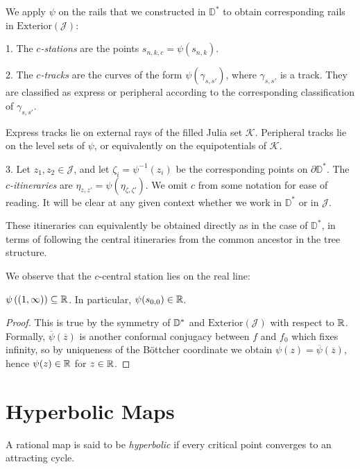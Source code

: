 We apply $\psi$ on the rails that we constructed in $\mathbb D^*$ to obtain corresponding rails in $\mathrm{Exterior}(\mathcal{J})$:
\begin{definition}

1. The 	\emph{$c$-stations} are the points  $s_{n,k,c}=\psi(s_{n,k})$.

2. The \emph{$c$-tracks} are the curves of the form $\psi \left(\gamma_{s,s'}\right)$, where $\gamma_{s,s'}$ is a track. They are classified as express or peripheral according to the corresponding classification of $\gamma_{s,s'}$. 

Express tracks lie on external rays of the filled Julia set $\mathcal K$.
Peripheral tracks lie on the level sets of $\psi$, or equivalently on the equipotentials of $\mathcal K$.

3. Let $z_1,z_2\in \mathcal J$, and let $\zeta_i=\psi^{-1}(z_i)$ be the corresponding points on $\partial \mathbb D^*$. 
The \emph{$c$-itineraries} are $\eta_{z,z'}=\psi(\eta_{\zeta,\zeta'})$.
We omit $c$ from some notation for ease of reading. It will be clear at any given context whether we work in $\mathbb D^*$ or in $\mathcal J$.


These itineraries can equivalently be obtained directly as in the case of $\mathbb D^*$, in terms of following the central itineraries from the common ancestor in the tree structure.
\end{definition}

We observe that the $c$-central station lies on the real line:

\begin{lemma}$\psi\left((1,\infty)\right)\subseteq\mathbb{R}$. In particular,
	$\psi(s_{0,0})\in\mathbb{R}$.
\end{lemma}
\begin{proof}
	This is true by the symmetry of $\mathbb{D}^{*}$ and $\mathrm{Exterior}(\mathcal{J})$
	with respect to $\mathbb{R}$. Formally, $\overline{\psi}(\overline{z})$
	is another conformal conjugacy between $f$ and $f_0$ which fixes infinity, so by uniqueness of the Böttcher coordinate we obtain $\psi(z)=\overline{\psi}(\overline{z})$,
	hence $\psi(z)\in\mathbb{R}$ for $z\in\mathbb{R}$.
\end{proof}

\section{Hyperbolic Maps}

A rational map is said to be \emph{hyperbolic} if every critical point converges to an attracting cycle.

